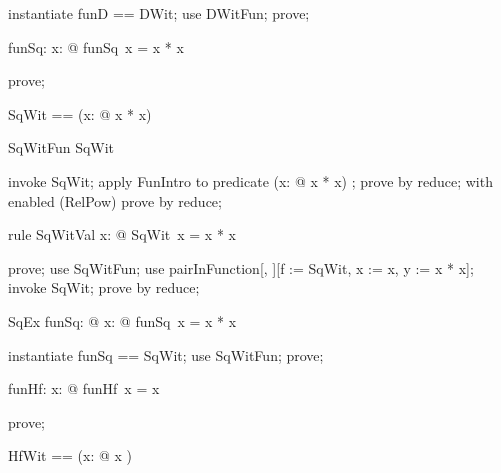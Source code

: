 \documentclass{article}
\begin{document}
\begin{zproof}
instantiate funD == DWit;
use DWitFun;
prove;
\end{zproof}

\begin{axdef}
  funSq: \nat \fun \nat
\where
   \forall x: \nat @ funSq~x = x * x
\end{axdef}

\begin{zproof}
prove;
\end{zproof}

\begin{zed}
  SqWit == (\lambda x: \nat @ x * x)
\end{zed}

\begin{theorem}{SqWitFun}
  SqWit \in \nat \fun \nat
\end{theorem}

\begin{zproof}
invoke SqWit;
apply FunIntro to predicate (\lambda x: \nat @ x * x) \in \nat \fun \nat;
prove by reduce;
with enabled (RelPow) prove by reduce;
\end{zproof}

\begin{theorem}{rule SqWitVal}
  \forall x: \nat @ SqWit~x = x * x
\end{theorem}

\begin{zproof}
prove;
use SqWitFun;
use pairInFunction[\nat, \nat][f := SqWit, x := x, y := x * x];
invoke SqWit;
prove by reduce;
\end{zproof}

\begin{theorem}{SqEx}
  \exists funSq: \nat \fun \nat @ \forall x: \nat @ funSq~x = x * x
\end{theorem}

\begin{zproof}
instantiate funSq == SqWit;
use SqWitFun;
prove;
\end{zproof}

\begin{axdef}
  funHf: \nat \fun \nat
\where
   \forall x: \nat @ funHf~x = x 
\end{axdef}

\begin{zproof}
prove;
\end{zproof}

\begin{zed}
  HfWit == (\lambda x: \nat @ x )
\end{zed}
\end{document}
